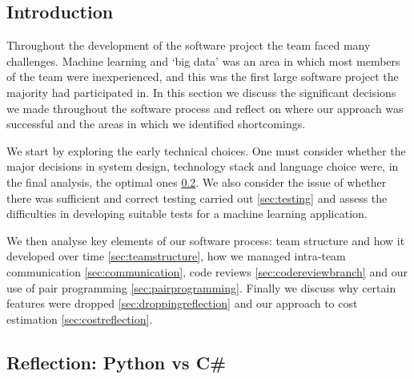 \documentclass{l3proj}
\begin{document}
\subsection{Introduction}
\label{sec:leadreflection}





Throughout the development of the software project the team faced many challenges. Machine learning and ‘big data’ was an area in which most members of the team were inexperienced, and this was the first large software project the majority had participated in. In this section we discuss the significant decisions we made throughout the software process and reflect on where our approach was successful and the areas in which we identified shortcomings. 

We start by exploring the early technical choices. One must consider whether the major decisions in system design, technology stack and language choice were, in the final analysis, the optimal ones \ref{sec:pyreflection}. We also consider the issue of whether there was sufficient and correct testing carried out \ref{sec:testing} and assess the difficulties in developing suitable tests for a machine learning application.

We then analyse key elements of our software process: team structure and how it developed over time \ref{sec:teamstructure}, how we managed intra-team communication  \ref{sec:communication}, code reviews \ref{sec:codereviewbranch} and our use of pair programming \ref{sec:pairprogramming}. Finally we discuss why certain features were dropped \ref{sec:droppingreflection} and our approach to cost estimation \ref{sec:costreflection}.


\subsection{Reflection: Python vs C\#}
\label{sec:pyreflection}
\end{document}
